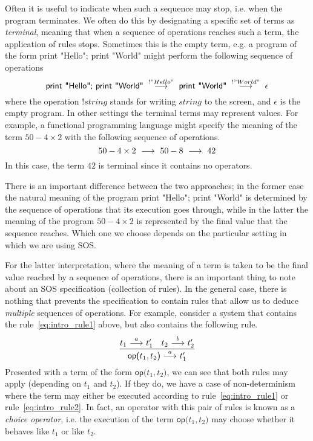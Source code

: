 Often it is useful to indicate when such a sequence may stop, i.e. when the
program terminates. We often do this by designating a specific set of terms as
\emph{terminal}, meaning that when a sequence of operations reaches such a term,
the application of rules stops.
Sometimes this is the empty term, e.g. a program of the form
\textsf{print "Hello"; print "World"} might perform the following sequence of
operations
\[
    \textsf{print "Hello"; print "World"}
    \;\ {\stackrel{{!"Hello"}}{\longrightarrow}}\ \;
    \textsf{print "World"}
    \;\ {\stackrel{{!"World"}}{\longrightarrow}}\ \;
    \epsilon
\]
where the operation $!string$ stands for writing $string$ to the screen, and
$\epsilon$ is the empty program. In other settings the terminal terms may represent
values. For example, a functional programming language might specify the meaning
of the term $50 - 4 \times 2$ with the following sequence of operations.
\[
    50 - 4 \times 2 \;\ {\stackrel{{}}{\longrightarrow}}\ \; 50 - 8 \;\ {\stackrel{{}}{\longrightarrow}}\ \; 42
\]
In this case, the term $42$ is terminal since it contains no operators.

There is an important difference between the two approaches; in the former case the natural meaning
of the program \textsf{print "Hello"; print "World"} is determined by the sequence
of operations that its execution goes through, while in the latter the meaning
of the program $50 - 4 \times 2$ is represented by the final value
that the sequence reaches. Which one we choose depends on the particular setting
in which we are using SOS.

For the latter interpretation, where the meaning of a term is taken to be the
final value reached by a sequence of operations, there is an important thing to
note about an SOS specification (collection of rules). In the general case, there
is nothing that prevents the specification to contain rules that allow us to
deduce \emph{multiple} sequences of operations. For example, consider a system
that contains the rule~\ref{eq:intro_rule1} above, but also contains the following
rule.
\begin{equation}\label{eq:intro_rule2}
    \frac{t_1 \ {\stackrel{{a}}{\longrightarrow}}\  t_1' \quad t_2 \ {\stackrel{{b}}{\longrightarrow}}\  t_2'}{\textsf{op(}t_1,t_2\textsf{)}\ {\stackrel{{a}}{\longrightarrow}}\  t_1'}
\end{equation}
Presented with a term of the form $\textsf{op(}t_1,t_2\textsf{)}$, we can see
that both rules may apply (depending on $t_1$ and $t_2$). If they do, we have
a case of non-determinism where the term may either be executed according to
rule~\ref{eq:intro_rule1} or rule~\ref{eq:intro_rule2}. In fact, an operator
with this pair of rules is known as a \emph{choice operator}, i.e. the execution
of the term $\textsf{op(}t_1,t_2\textsf{)}$ may choose whether it behaves like
$t_1$ or like $t_2$.

